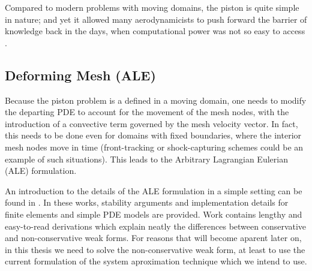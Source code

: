 Compared to modern problems with moving domains,
the piston is quite simple in nature;
and yet it allowed many aerodynamicists to push forward the barrier of knowledge 
back in the days, when computational power was not so easy to access 
\cite{1956_PistonTheoryNewAerodynamicTool}. 

\subsection{Deforming Mesh (ALE)}
\label{sec:literature_review_deforming_mesh}
Because the piston problem is a defined in a moving domain,
one needs to modify the departing PDE to account for the movement 
of the mesh nodes, with the introduction of a convective term 
governed by the mesh velocity vector.
In fact, this needs to be done even for domains with fixed boundaries, 
where the interior mesh nodes move in time 
(front-tracking or shock-capturing schemes could be an example
of such situations).
This leads to the Arbitrary Lagrangian Eulerian (ALE) formulation.


An introduction to the details of the ALE formulation in a simple setting
can be found in
\cite{formaggiaALE,
formaggiaALE_secondOrder,
FSIPistonProblem}.
In these works, stability arguments and implementation details for finite elements
and simple PDE models are provided.
Work \cite{formaggiaALE} contains lengthy and easy-to-read derivations which explain neatly
the differences between conservative and non-conservative weak forms.
For reasons that will become aparent later on,
in this thesis we need to solve the \mbox{non-conservative} weak form,
at least to use the current formulation of the system aproximation technique which 
we intend to use.

